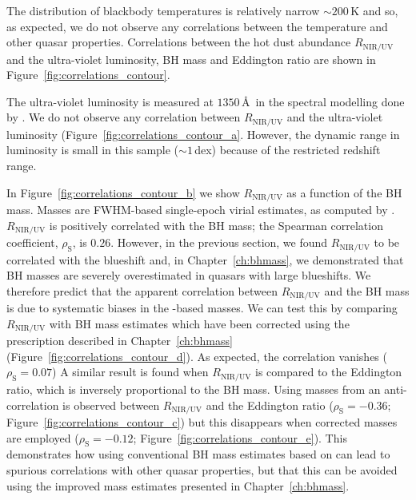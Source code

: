 The distribution of blackbody temperatures is relatively narrow $\sim200$\,K and so, as expected, we do not observe any correlations between the temperature and other quasar properties. 
Correlations between the hot dust abundance $R_{\text{NIR/UV}}$ and the ultra-violet luminosity, BH mass and Eddington ratio are shown in Figure~\ref{fig:correlations_contour}. 

The ultra-violet luminosity is measured at $1350$\,\AA\, in the spectral modelling done by \citet{shen11}. 
We do not observe any correlation between $R_{\text{NIR/UV}}$ and the ultra-violet luminosity (Figure~\ref{fig:correlations_contour_a}. 
However, the dynamic range in luminosity is small in this sample ($\sim1$\,dex) because of the restricted redshift range. 

In Figure~\ref{fig:correlations_contour_b} we show $R_{\text{NIR/UV}}$ as a function of the BH mass. 
Masses are  FWHM-based single-epoch virial estimates, as computed by \citet{shen11}. 
$R_{\text{NIR/UV}}$ is positively correlated with the BH mass; the Spearman correlation coefficient, $\rho_{\text{S}}$, is $0.26$. 
However, in the previous section, we found $R_{\text{NIR/UV}}$ to be correlated with the  blueshift and, in Chapter~\ref{ch:bhmass}, we demonstrated that BH masses are severely overestimated in quasars with large  blueshifts.
We therefore predict that the apparent correlation between $R_{\text{NIR/UV}}$ and the BH mass is due to systematic biases in the -based masses. 
We can test this by comparing $R_{\text{NIR/UV}}$ with BH mass estimates which have been corrected using the prescription described in Chapter~\ref{ch:bhmass} (Figure~\ref{fig:correlations_contour_d}). 
As expected, the correlation vanishes ($\rho_{\text{S}}=0.07$)
A similar result is found when $R_{\text{NIR/UV}}$ is compared to the Eddington ratio, which is inversely proportional to the BH mass.  
Using masses from \citet{shen11} an anti-correlation is observed between $R_{\text{NIR/UV}}$ and the Eddington ratio ($\rho_{\text{S}}=-0.36$; Figure~\ref{fig:correlations_contour_c}) but this disappears when corrected masses are employed ($\rho_{\text{S}}=-0.12$; Figure~\ref{fig:correlations_contour_e}). 
This demonstrates how using conventional BH mass estimates based on  can lead to spurious correlations with other quasar properties, but that this can be avoided using the improved mass estimates presented in Chapter~\ref{ch:bhmass}. 

